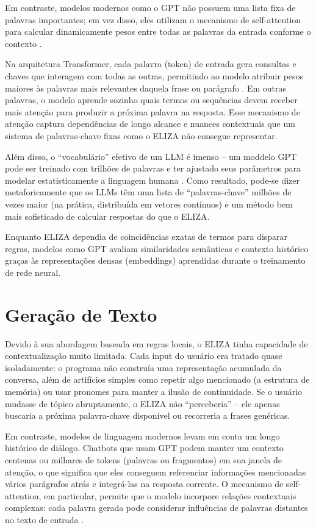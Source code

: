 \documentclass[14pt,a4paper,oneside]{book}
\begin{document}
Em contraste, modelos modernos como o GPT não possuem uma lista fixa de palavras importantes; em vez disso, eles utilizam o mecanismo de self-attention para calcular dinamicamente pesos entre todas as palavras da entrada conforme o contexto \cite{Vaswani2017}.

Na arquitetura Transformer, cada palavra (token) de entrada gera consultas e chaves que interagem com todas as outras, permitindo ao modelo atribuir pesos maiores às palavras mais relevantes daquela frase ou parágrafo \cite{Vaswani2017}. Em outras palavras, o modelo aprende sozinho quais termos ou sequências devem receber mais atenção para produzir a próxima palavra na resposta. Esse mecanismo de atenção captura dependências de longo alcance e nuances contextuais que um sistema de palavras-chave fixas como o ELIZA não consegue representar.

Além disso, o “vocabulário” efetivo de um LLM é imenso – um moddelo GPT pode ser treinado com trilhões de palavras e ter ajustado seus parâmetros para modelar estatisticamente a linguagem humana \cite{Vaswani2017}. Como resultado, pode-se dizer metaforicamente que os LLMs têm uma lista de “palavras-chave” milhões de vezes maior (na prática, distribuída em vetores contínuos) e um método bem mais sofisticado de calcular respostas do que o ELIZA.

Enquanto ELIZA dependia de coincidências exatas de termos para disparar regras, modelos como GPT avaliam similaridades semânticas e contexto histórico graças às representações densas (embeddings) aprendidas durante o treinamento de rede neural.

\section{Geração de Texto}

Devido à sua abordagem baseada em regras locais, o ELIZA tinha capacidade de contextualização muito limitada. Cada input do usuário era tratado quase isoladamente: o programa não construía uma representação acumulada da conversa, além de artifícios simples como repetir algo mencionado (a estrutura de memória) ou usar pronomes para manter a ilusão de continuidade. Se o usuário mudasse de tópico abruptamente, o ELIZA não “perceberia” – ele apenas buscaria a próxima palavra-chave disponível ou recorreria a frases genéricas.

Em contraste, modelos de linguagem modernos levam em conta um longo histórico de diálogo. Chatbots que usam GPT podem manter um contexto centenas ou milhares de tokens (palavras ou fragmentos) em sua janela de atenção, o que significa que eles conseguem referenciar informações mencionadas vários parágrafos atrás e integrá-las na resposta corrente. O mecanismo de self-attention, em particular, permite que o modelo incorpore relações contextuais complexas: cada palavra gerada pode considerar influências de palavras distantes no texto de entrada \cite{Vaswani2017}.
\end{document}

